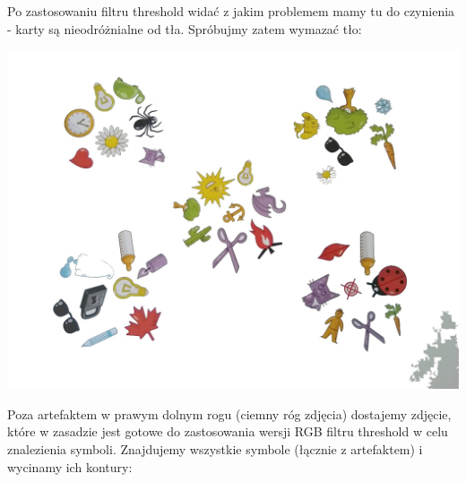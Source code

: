 \documentclass[10pt,a4paper]{article}
\begin{document}
\newpage
Po zastosowaniu filtru threshold widać z jakim problemem mamy tu do czynienia - karty są nieodróżnialne od tła. Spróbujmy zatem wymazać tło:
\begin{center}
\includegraphics[scale=0.25]{2.3/20.jpg}
\end{center}
Poza artefaktem w prawym dolnym rogu (ciemny róg zdjęcia) dostajemy zdjęcie, które w zasadzie jest gotowe do zastosowania wersji RGB filtru threshold w celu znalezienia symboli. Znajdujemy wszystkie symbole (łącznie z artefaktem) i wycinamy ich kontury:
\end{document}
